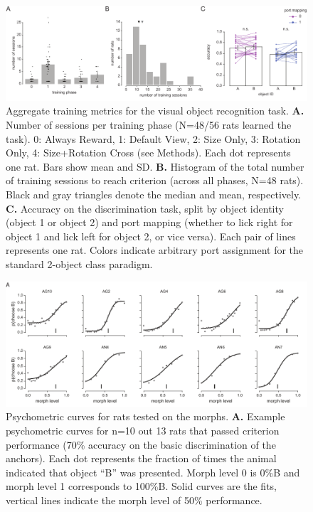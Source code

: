 \begin{figure}[hbt!]
\includegraphics[width=\textwidth]{figures/supplemental/fig_s1_aggregate_training/fig_s1_aggregate_training.pdf}
    \centering
    \caption[Training timecourse for the object recognition task]{Aggregate training metrics for the visual object recognition task. 
    \textbf{A.} Number of sessions per training phase (N=48/56 rats learned the task). 0: Always Reward, 1: Default View, 2: Size Only, 3: Rotation Only, 4: Size+Rotation Cross (see Methods). Each dot represents one rat. Bars show mean and SD.
    \textbf{B.} Histogram of the total number of training sessions to reach criterion (across all phases, N=48 rats). Black and gray triangles denote the median and mean, respectively. 
    \textbf{C.} Accuracy on the discrimination task, split by object identity (object 1 or object 2) and port mapping (whether to lick right for object 1 and lick left for object 2, or vice versa). Each pair of lines represents one rat. Colors indicate arbitrary port assignment for the standard 2-object class paradigm. 
    \label{supfig:aggregate_training}}
\end{figure}

\begin{figure}[hbt!]
\includegraphics[width=\textwidth]{figures/supplemental/fig_s2_morphs_per_animal/fig_s2_morphs_per_animal.pdf}
    \centering
    \caption[Example psychometric curves]{Psychometric curves for rats tested on the morphs. 
    \textbf{A.} Example psychometric curves for n=10 out 13 rats that passed criterion performance (70\% accuracy on the basic discrimination of the anchors). Each dot represents the fraction of times the animal indicated that object ``B'' was presented. Morph level 0 is 0\%B and morph level 1 corresponds to 100\%B. Solid curves are the fits, vertical lines indicate the morph level of 50\% performance. 
    \label{supfig:morphs}}
\end{figure}

